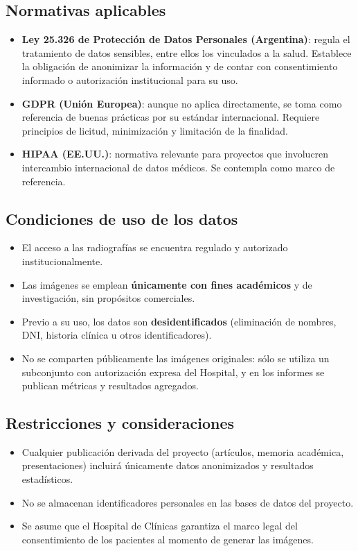 \documentclass[
11pt, %
]{charter}
\begin{document}
\subsection*{Normativas aplicables}
\begin{itemize}
    \item \textbf{Ley 25.326 de Protección de Datos Personales (Argentina)}: regula el tratamiento de datos sensibles, entre ellos los vinculados a la salud. Establece la obligación de anonimizar la información y de contar con consentimiento informado o autorización institucional para su uso.
    \item \textbf{GDPR (Unión Europea)}: aunque no aplica directamente, se toma como referencia de buenas prácticas por su estándar internacional. Requiere principios de licitud, minimización y limitación de la finalidad.
    \item \textbf{HIPAA (EE.UU.)}: normativa relevante para proyectos que involucren intercambio internacional de datos médicos. Se contempla como marco de referencia.
\end{itemize}

\subsection*{Condiciones de uso de los datos}
\begin{itemize}
    \item El acceso a las radiografías se encuentra regulado y autorizado institucionalmente.
    \item Las imágenes se emplean \textbf{únicamente con fines académicos} y de investigación, sin propósitos comerciales.
    \item Previo a su uso, los datos son \textbf{desidentificados} (eliminación de nombres, DNI, historia clínica u otros identificadores).
    \item No se comparten públicamente las imágenes originales: sólo se utiliza un subconjunto con autorización expresa del Hospital, y en los informes se publican métricas y resultados agregados.
\end{itemize}

\subsection*{Restricciones y consideraciones}
\begin{itemize}
    \item Cualquier publicación derivada del proyecto (artículos, memoria académica, presentaciones) incluirá únicamente datos anonimizados y resultados estadísticos.
    \item No se almacenan identificadores personales en las bases de datos del proyecto.
    \item Se asume que el Hospital de Clínicas garantiza el marco legal del consentimiento de los pacientes al momento de generar las imágenes.
\end{itemize}
\end{document}
